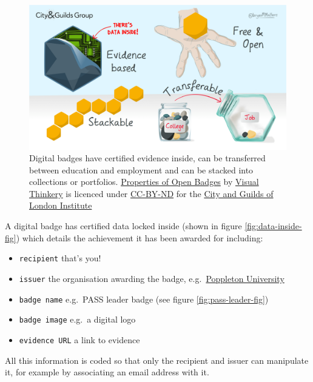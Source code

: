 \documentclass[
]{book}
\providecommand{\tightlist}{%
  \setlength{\itemsep}{0pt}\setlength{\parskip}{0pt}}
\begin{document}
\begin{figure}

{\centering \includegraphics[width=1\linewidth]{images/Properties-of-Open-Badges} 

}

\caption{Digital badges have certified evidence inside, can be transferred between education and employment and can be stacked into collections or portfolios. \href{https://bryanmmathers.com/properties-open-badges/}{Properties of Open Badges} by \href{https://visualthinkery.com/}{Visual Thinkery} is licenced under \href{https://creativecommons.org/licenses/by-nd/4.0/}{CC-BY-ND} for the \href{https://en.wikipedia.org/wiki/City_and_Guilds_of_London_Institute}{City and Guilds of London Institute}}\label{fig:badge-properties-fig}
\end{figure}



A digital badge has certified data locked inside (shown in figure \ref{fig:data-inside-fig}) which details the achievement it has been awarded for including:

\begin{itemize}
\tightlist
\item
  \texttt{recipient} that's you!
\item
  \texttt{issuer} the organisation awarding the badge, e.g.~\href{https://twitter.com/PoppletonUni}{Poppleton University}
\item
  \texttt{badge\ name} e.g.~PASS leader badge (see figure \ref{fig:pass-leader-fig})
\item
  \texttt{badge\ image} e.g.~a digital logo
\item
  \texttt{evidence\ URL} a link to evidence
\end{itemize}

All this information is coded so that only the recipient and issuer can manipulate it, for example by associating an email address with it.
\end{document}
